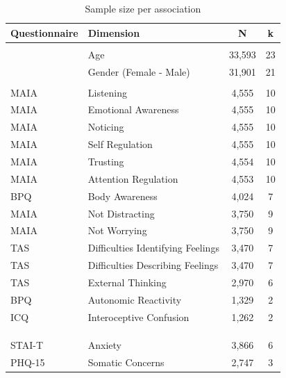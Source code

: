 \begin{table}[t]
\caption*{
{\fontsize{7}{8}\selectfont  Sample size per association\fontsize{7}{8}\selectfont }
} 
\fontsize{7.0pt}{8.0pt}\selectfont
\begin{tabular*}{\linewidth}{@{\extracolsep{\fill}}llcc}
\toprule
Questionnaire & Dimension & N & k \\ 
\midrule\addlinespace[2.5pt]
\multicolumn{4}{l}{{\bfseries Demographics}} \\[2.5pt] 
\midrule\addlinespace[2.5pt]
 & Age & 33,593 & 23 \\ 
 & Gender (Female - Male) & 31,901 & 21 \\ 
\midrule\addlinespace[2.5pt]
\multicolumn{4}{l}{{\bfseries Interoception}} \\[2.5pt] 
\midrule\addlinespace[2.5pt]
MAIA & Listening & 4,555 & 10 \\ 
MAIA & Emotional Awareness & 4,555 & 10 \\ 
MAIA & Noticing & 4,555 & 10 \\ 
MAIA & Self Regulation & 4,555 & 10 \\ 
MAIA & Trusting & 4,554 & 10 \\ 
MAIA & Attention Regulation & 4,553 & 10 \\ 
BPQ & Body Awareness & 4,024 & 7 \\ 
MAIA & Not Distracting & 3,750 & 9 \\ 
MAIA & Not Worrying & 3,750 & 9 \\ 
TAS & Difficulties Identifying Feelings & 3,470 & 7 \\ 
TAS & Difficulties Describing Feelings & 3,470 & 7 \\ 
TAS & External Thinking & 2,970 & 6 \\ 
BPQ & Autonomic Reactivity & 1,329 & 2 \\ 
ICQ & Interoceptive Confusion & 1,262 & 2 \\ 
{\cellcolor[HTML]{FFF8E1}{BVAQ}} & {\cellcolor[HTML]{FFF8E1}{Affective}} & {\cellcolor[HTML]{FFF8E1}{814}} & {\cellcolor[HTML]{FFF8E1}{1}} \\ 
{\cellcolor[HTML]{FFF8E1}{BVAQ}} & {\cellcolor[HTML]{FFF8E1}{Cognitive}} & {\cellcolor[HTML]{FFF8E1}{814}} & {\cellcolor[HTML]{FFF8E1}{1}} \\ 
\midrule\addlinespace[2.5pt]
\multicolumn{4}{l}{{\bfseries Mood}} \\[2.5pt] 
\midrule\addlinespace[2.5pt]
STAI-T & Anxiety & 3,866 & 6 \\ 
PHQ-15 & Somatic Concerns & 2,747 & 3 \\ 

\end{tabular*}
\end{table}
